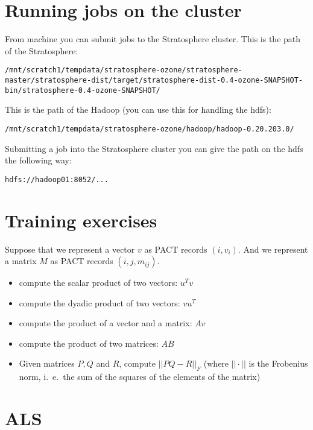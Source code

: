 \documentclass[12pt]{article}
\begin{document}
\section{Running jobs on the cluster}

From machine \vtext you can submit jobs to the Stratosphere cluster. This is the path of the Stratosphere:

\begin{verbatim}
/mnt/scratch1/tempdata/stratosphere-ozone/stratosphere-master/stratosphere-dist/target/stratosphere-dist-0.4-ozone-SNAPSHOT-bin/stratosphere-0.4-ozone-SNAPSHOT/
\end{verbatim}

This is the path of the Hadoop (you can use this for handling the hdfs):

\begin{verbatim}
/mnt/scratch1/tempdata/stratosphere-ozone/hadoop/hadoop-0.20.203.0/
\end{verbatim}

Submitting a job into the Stratosphere cluster you can give the path on the hdfs the following way:

\begin{verbatim}
hdfs://hadoop01:8052/...
\end{verbatim}

\section{Training exercises}

Suppose that we represent a vector $v$ as PACT records $(i, v_i)$. And we represent
a matrix $M$ as PACT records $(i, j, m_{ij})$.

\begin{itemize}
  \item compute the scalar product of two vectors: $u^T v$
  \item compute the dyadic product of two vectors: $v u^T$
  \item compute the product of a vector and a matrix: $Av$
  \item compute the product of two matrices: $AB$
  \item Given matrices $P, Q$ and $R$, compute $||PQ - R||_F$ (where $||\cdot||$ is the Frobenius norm, i.\ e.\  the sum of
    the squares of the elements of the matrix)
\end{itemize}

\section{ALS}
\end{document}
